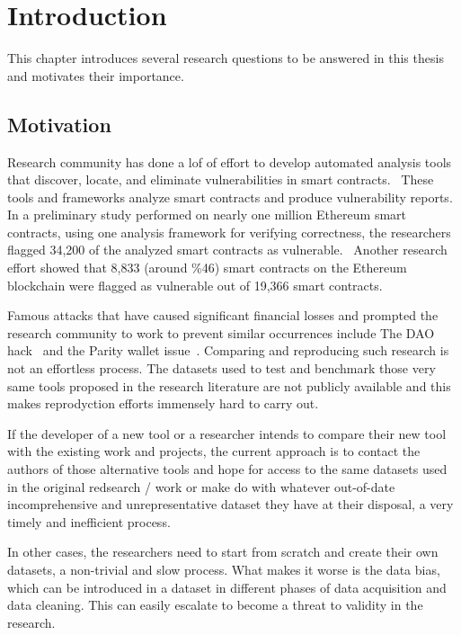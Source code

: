 \chapter{Introduction}

  This chapter introduces several research questions to be answered in this thesis and motivates their importance.

\section{Motivation}
  Research community has done a lof of effort to develop automated analysis tools~\cite{ref_tools} that discover, locate, and eliminate vulnerabilities in smart contracts.~\cite{ref_tools}
  These tools and frameworks analyze smart contracts and produce vulnerability reports.
  In a preliminary study performed on nearly one million Ethereum smart contracts, using one analysis framework for verifying correctness, the researchers flagged 34,200 of the analyzed smart contracts as vulnerable.~\cite{ref_flag1}
  Another research effort showed that 8,833 (around \%46) smart contracts on the Ethereum blockchain were flagged as vulnerable out of 19,366 smart contracts.~\cite{ref_flag2}

  Famous attacks that have caused significant financial losses and prompted the research community to work to prevent similar occurrences include The DAO hack~\cite{dao} and the Parity wallet issue~\cite{ref_parity}.
  Comparing and reproducing such research is not an effortless process.
	The datasets used to test and benchmark those very same tools proposed in the research literature are not publicly available and this makes reprodyction efforts immensely hard to carry out.

  If the developer of a new tool or a researcher intends to compare their new tool with the existing work and projects, the current approach is to contact the authors of those alternative tools and hope for access to the same datasets used in the original redsearch / work or make do with whatever out-of-date incomprehensive and unrepresentative dataset they have at their disposal, a very timely and inefficient process.

  In other cases, the researchers need to start from scratch and create their own datasets, a non-trivial and slow process.
  What makes it worse is the data bias, which can be introduced in a dataset in different phases of data acquisition and data cleaning.
  This can easily escalate to become a threat to validity in the research.~\cite{Empirical-Evaluation-of-Smart-Contract-Testing:What-is-the-Best-Choice}

